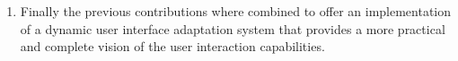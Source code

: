\begin{enumerate}[label=\alph*)]

  \item Finally the previous contributions where combined to offer an 
  implementation of a dynamic user interface adaptation system that provides a 
  more practical and complete vision of the user interaction capabilities.
  
\end{enumerate}